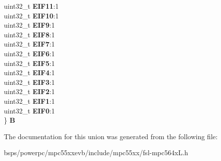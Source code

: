 \begin{DoxyCompactItemize}
\begin{tabbing}
\>uint32\_t {\bfseries EIF11}:1\\
\>uint32\_t {\bfseries EIF10}:1\\
\>uint32\_t {\bfseries EIF9}:1\\
\>uint32\_t {\bfseries EIF8}:1\\
\>uint32\_t {\bfseries EIF7}:1\\
\>uint32\_t {\bfseries EIF6}:1\\
\>uint32\_t {\bfseries EIF5}:1\\
\>uint32\_t {\bfseries EIF4}:1\\
\>uint32\_t {\bfseries EIF3}:1\\
\>uint32\_t {\bfseries EIF2}:1\\
\>uint32\_t {\bfseries EIF1}:1\\
\>uint32\_t {\bfseries EIF0}:1\\
\} {\bfseries B}\\

\end{tabbing}\end{DoxyCompactItemize}


The documentation for this union was generated from the following file\+:\begin{DoxyCompactItemize}
\item 
bsps/powerpc/mpc55xxevb/include/mpc55xx/fsl-\/mpc564x\+L.\+h\end{DoxyCompactItemize}
